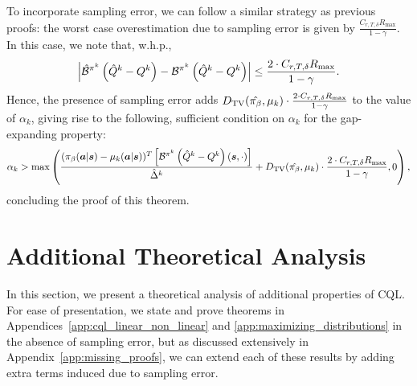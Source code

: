To incorporate sampling error, we can follow a similar strategy as previous proofs: the worst case overestimation due to sampling error is given by $\frac{C_{r, T, \delta} R_{\max}}{1 - \gamma}$. In this case, we note that, w.h.p.,
\begin{equation*}
    \left\vert \hat{\mathcal{B}}^{\pi^k} \left( \hat{Q}^k - Q^k \right) - \mathcal{B}^{\pi^k} \left( \hat{Q}^k - Q^k \right) \right\vert \leq \frac{2 \cdot C_{r, T, \delta} R_{\max}}{1 - \gamma}. 
\end{equation*}
Hence, the presence of sampling error adds $D_{\mathrm{TV}}(\hat{{\pi_\beta}}, \mu_k) \cdot \frac{2 \cdot C_{r, T, \delta} R_{\max}}{1 - \gamma}$ to the value of $\alpha_k$, giving rise to the following, sufficient condition on $\alpha_k$ for the gap-expanding property:
\begin{equation*}
     \alpha_k > \max \left(\frac{({\pi_\beta}(\boldsymbol{a}|\boldsymbol{s}) - \mu_k(\boldsymbol{a}|\boldsymbol{s}))^T \left[ \mathcal{B}^{\pi^k} \left( \hat{Q}^k - Q^k \right)(\boldsymbol{s}, \cdot) \right]}{\hat{\Delta}^k} + D_{\mathrm{TV}}(\hat{{\pi_\beta}}, \mu_k) \cdot \frac{2 \cdot C_{r, T, \delta} R_{\max}}{1 - \gamma}, 0\right),
\end{equation*}
concluding the proof of this theorem.

\section{Additional Theoretical Analysis}
\label{app:additional_theory}

In this section, we present a theoretical analysis of additional properties of CQL. For ease of presentation, we state and prove theorems in Appendices~\ref{app:cql_linear_non_linear} and \ref{app:maximizing_distributions} in the absence of sampling error, but as discussed extensively in Appendix~\ref{app:missing_proofs}, we can extend each of these results by adding extra terms induced due to sampling error. 

